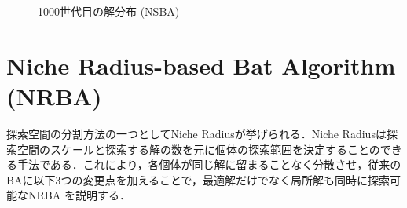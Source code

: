\documentclass[a4j,11pt]{jarticle}
\begin{document}
\begin{figure}[t]
\centering
{}
\caption{1000世代目の解分布 (NSBA)}
\label{fig:nsba-results_nsba_1000}
\end{figure}

\FloatBarrier
\newpage
\section{Niche Radius-based Bat Algorithm (NRBA)}
\label{sec:NRBA}
探索空間の分割方法の一つとしてNiche Radiusが挙げられる．Niche Radiusは探索空間のスケールと探索する解の数を元に個体の探索範囲を決定することのできる手法である．これにより，各個体が同じ解に留まることなく分散させ，従来のBAに以下3つの変更点を加えることで，最適解だけでなく局所解も同時に探索可能なNRBA \cite{NRBA} を説明する．
\end{document}
